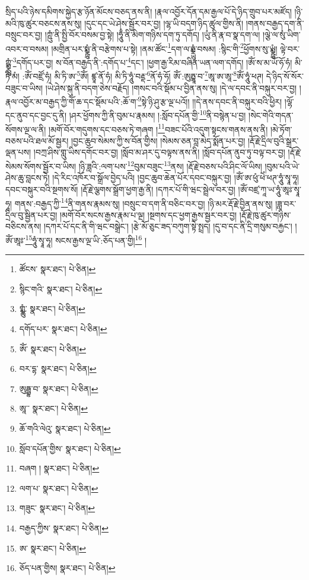 སྲིད་པའི་ཉེས་དམིགས་སྐྱེད་རྩ་ཉོན་མོངས་བཅད་ནས་ནི། །རྣལ་འབྱོར་དོན་དམ་རྒྱལ་པོ་དེ་ཉིད་གྲུབ་པར་མཛོད། །ཉི་མའི་ཁུ་ཚུར་བཅངས་ནས་སུ། །དུང་དང་ཡེ་ཤེས་སྦྱོར་བར་བྱ། །ལྷ་ཡི་བདག་ཉིད་ཚུལ་གྱིས་ནི། །གནས་བརྒྱད་དག་ནི་བསྲུང་བར་བྱ། །ཀྵུཾ་ནི་སྤྱི་བོར་བསམ་བྱ་སྟེ། །ཧཱུྃ་ནི་མིག་གཉིས་དག་ཏུ་དགོད། །ཡུཾ་ནི་རྣ་བ་སྣ་དག་ལ། །ལྕེ་ལ་སུཾ་ཡིག་འབར་བ་བསམ། །མགྲིན་པར་སྨྼྻུཾ་ནི་བརྩེགས་པ་སྟེ། །ནམ་ཚོང་\footnote{ཚོངས་  སྣར་ཐང་།  པེ་ཅིན། }དག་ལ་ཧྨྼྻུཾ་བསམ། :སྙིང་གི་\footnote{སྙིང་གའི་  སྣར་ཐང་།  པེ་ཅིན། }ཕྱོགས་སུ་ཡྨྼྻུཾ། ལྟེ་བར་ཀྵྨྼྻུཾ་\footnote{གྨྪུཾ་  སྣར་ཐང་།  པེ་ཅིན། }དགོད་པར་བྱ། ས་བོན་བརྒྱད་ནི་:དགོད་པ་\footnote{དགོད་པར་  སྣར་ཐང་།  པེ་ཅིན། }དང་། །ཕྱག་རྒྱ་རིམ་བཞིན་ཡན་ལག་དགོད། །ཨོཾ་ས་མ་ཡོ་ཧོ་ཧཾ། མི་ཏི་མཾ། :ཨོཾ་བཛྲོ་ཧཾ། མི་ཏི་ཨ་\footnote{ཨོཾ་  སྣར་ཐང་།  པེ་ཅིན། }ཨོཾ། ཛྙཱ་ནོ་ཧཾ། མི་ཏི་ཧཱུཾ་བརྡྡ་\footnote{བར་དྷ་  སྣར་ཐང་།  པེ་ཅིན། }ནོ་ཧཾ་ཧོ། ཨོཾ་:ཨུཏྤྷཱ་བ་\footnote{ཨུཏྦྷ་བ་  སྣར་ཐང་།  པེ་ཅིན། }ཨཱ་ཨ་ཨཱ་\footnote{ཨཱ་་  སྣར་ཐང་།  པེ་ཅིན། }ཨོཾ་ཧཱུཾ་ཕཊ། དེ་ཉིད་སོ་སོར་བཟུང་བ་ཡིས། །ཡེ་ཤེས་སྐུ་ནི་བདག་ཅེས་བརྗོད། །གསང་བའི་སྡོམ་པ་བྱིན་ནས་སུ། །དེ་ལ་དབང་ནི་བསྐུར་བར་བྱ། །རྣལ་འབྱོར་མ་བརྒྱད་ཀྱི་གོ་ཆ་དང་སྡོམ་པའི་:ཆོ་ག་\footnote{ཆོ་གའི་ལེའུ་  སྣར་ཐང་།  པེ་ཅིན། }སྟེ་ཉི་ཤུ་རྩ་ལྔ་པའོ།། །།དེ་ནས་དབང་ནི་བསྐུར་བའི་ཕྱིར། །ལྷོ་དང་ནུབ་དང་བྱང་དུ་ནི། །ཤར་ཕྱོགས་ཀྱི་ནི་བུམ་པ་རྣམས། །:སློབ་དཔོན་གྱི་\footnote{སློབ་དཔོན་གྱིས་  སྣར་ཐང་།  པེ་ཅིན། }ནི་བསྙེན་པ་བྱ། །སེང་གེའི་གདན་སོགས་ལྔ་ལ་ནི། །མགོ་བོར་གདུགས་དང་བཅས་ཏེ་གཞག །\footnote{བཞག །  སྣར་ཐང་།  པེ་ཅིན། }བཟང་པོའི་འདུག་སྟངས་གནས་ནས་ནི། །མེ་ཏོག་བཅས་པའི་ཐལ་མོ་སྦྱར། །བྱང་ཆུབ་སེམས་ཀྱི་ས་བོན་གྱིས། །སེམས་ཅན་བླ་མེད་སྨོན་པར་བྱ། །རྡོ་རྗེ་དྲིལ་བུའི་སྒྲར་ལྡན་པས། །བཀྲ་ཤིས་གླུ་ཡིས་དགོང་བར་བྱ། །སློབ་མ་ཤར་དུ་བལྟས་ནས་ནི། །སློབ་དཔོན་ནུབ་ཏུ་བལྟ་བར་བྱ། །རྡོ་རྗེ་སེམས་སོགས་སྦྱོར་བ་ཡིས། །ཉི་ཟླའི་:ལག་པས་\footnote{ལག་པ་  སྣར་ཐང་།  པེ་ཅིན། }བུམ་བཟུང་\footnote{གཟུང་  སྣར་ཐང་།  པེ་ཅིན། }ནས། །རྡོ་རྗེ་བཅས་པའི་ཤིང་ལོ་ཡིས། །བུམ་པའི་ཡེ་ཤེས་ཆུ་བླངས་ཏེ། །དེ་རིང་འཁོར་བ་སྒྲོལ་བྱེད་པའི། །བྱང་ཆུབ་ཆེན་པོར་དབང་བསྐུར་བྱ། །ཨོཾ་ཨ་ཕུཾ་ཕེཾ་ཕཊ་ཧཱུཾ་སྭཱ་ཧཱ། དབང་བསྐུར་བའི་སྔགས་སོ། །རྡོ་རྗེ་ལྕགས་སྒྲོག་ཕྱག་རྒྱ་ནི། །དཀར་པོ་གི་ཝང་སྦྲེལ་བར་བྱ། །ཨོཾ་བཛྲ་ཀཱ་ཡ་ཧཱུཾ་ཨཱཿ་སྭཱ་ཧཱ། གནས་:བརྒྱད་ཀྱི་\footnote{བརྒྱད་ཀྱིས་  སྣར་ཐང་།  པེ་ཅིན། }ནི་གནས་རྣམས་སུ། །བསྲུང་བ་དག་ནི་བཅིང་བར་བྱ། །ཉི་མར་རྡོ་རྗེ་བྱིན་ནས་སུ། །ཟླ་བར་དྲིལ་བུ་སྦྱིན་པར་བྱ། །མགོ་བོར་སངས་རྒྱས་རྣམ་པ་ལྔ། །སྔགས་དང་ཕྱག་རྒྱས་སྦྱར་བར་བྱ། །རྡོ་རྗེ་ཁུ་ཚུར་གཉིས་བཅིངས་ནས། །དཀར་པོ་དང་ནི་གི་ཝང་བསྒྲེང་། །རྩེ་མོ་ཅུང་ཟད་བཀུག་སྟེ་སྤྲད། །དུ་བ་དང་ནི་དྲི་གསུམ་བརྐྱང་། །ཨོཾ་ཨཱཿ་\footnote{ཨ་  སྣར་ཐང་།  པེ་ཅིན། }ཧཱུཾ་སྭཱ་ཧཱ། སངས་རྒྱས་ལྔ་ཡི་:ཅོད་པན་གྱི།\footnote{ཅོད་པན་གྱིས།  སྣར་ཐང་།  པེ་ཅིན། } །
